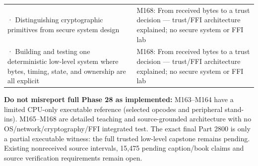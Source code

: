{\begin{longtable}[]{@{}
  >{\raggedright\arraybackslash}p{}
  >{\raggedright\arraybackslash}p{}@{}}
2799 · Distinguishing cryptographic primitives from secure system design & M168: From received bytes to a trust decision --- trust/FFI architecture explained; no secure system or FFI lab \\
2800 · Building and testing one deterministic low-level system where bytes, timing, state, and ownership are all explicit & M168: From received bytes to a trust decision --- trust/FFI architecture explained; no secure system or FFI lab \\
\end{longtable}
}

\textbf{Do not misreport full Phase 28 as implemented:} M163--M164 have a limited CPU-only executable reference (selected opcodes and peripheral stand-ins). M165--M168 are detailed teaching and source-grounded architecture with no OS/network/cryptography/FFI integrated test. The exact final Part 2800 is only a partial executable witness: the full trusted low-level capstone remains pending. Existing nonreceived source intervals, 15,475 pending caption/book claims and source verification requirements remain open.
